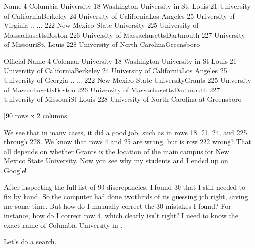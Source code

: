 \documentclass[letterpaper,10pt,english]{sphinxmanual}
\begin{document}
\begin{sphinxVerbatim}[commandchars=\\\{\}]
                                         Name  \PYGZbs{}
4                         Columbia University   
18         Washington University in St. Louis   
21         University of California\PYGZhy{}\PYGZhy{}Berkeley   
24      University of California\PYGZhy{}\PYGZhy{}Los Angeles   
25                     University of Virginia   
..                                        ...   
222               New Mexico State University   
225       University of Massachusetts\PYGZhy{}\PYGZhy{}Boston   
226    University of Massachusetts\PYGZhy{}\PYGZhy{}Dartmouth   
227         University of Missouri\PYGZhy{}\PYGZhy{}St. Louis   
228  University of North Carolina\PYGZhy{}\PYGZhy{}Greensboro   

                                  Official Name  
4                            Coleman University  
18            Washington University in St Louis  
21            University of California\PYGZhy{}Berkeley  
24         University of California\PYGZhy{}Los Angeles  
25                        University of Georgia  
..                                          ...  
222          New Mexico State University\PYGZhy{}Grants  
225          University of Massachusetts\PYGZhy{}Boston  
226       University of Massachusetts\PYGZhy{}Dartmouth  
227             University of Missouri\PYGZhy{}St Louis  
228  University of North Carolina at Greensboro  

[90 rows x 2 columns]
\end{sphinxVerbatim}

We see that in many cases, it did a good job, such as in rows 18, 21, 24, and 225 through 228.  We know that rows 4 and 25 are wrong, but is row 222 wrong?  That all depends on whether Grants is the location of the main campus for New Mexico State University.  Now you see why my students and I ended up on Google!

After inspecting the full list of 90 discrepancies, I found 30 that I still needed to fix by hand.  So the computer had done two\sphinxhyphen{}thirds of its guessing job right, saving me some time.  But how do I manually correct the 30 mistakes I found?  For instance, how do I correct row 4, which clearly isn’t right?  I need to know the exact name of Columbia University in .

Let’s do a search.

\begin{sphinxVerbatim}[commandchars=\\\{\}]
\PYG{p}{[}\PYG{p}{[}\PYG{p}{]}  \PYG{p}{]}\PYG{p}{[}\PYG{p}{]}
\end{sphinxVerbatim}
\end{document}
